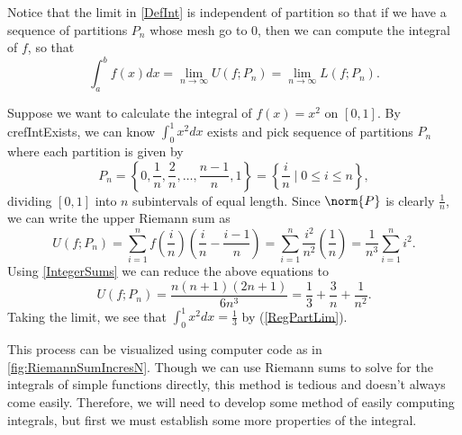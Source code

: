 Notice that the limit in \cref{DefInt} is independent of partition so that if we have a sequence of partitions $P_n$ whose mesh go to 0, then we can compute the integral of $f$, so that
\begin{equation}\label{RegPartLim}
  \int_{a}^{b}f(x)dx=\lim\limits_{n\to\infty}U(f;P_n)=\lim\limits_{n\to\infty}L(f;P_n).
\end{equation}
\begin{exmp}
Suppose we want to calculate the integral of $f(x)=x^2$ on $[0,1]$. By cref{IntExists}, we can know $\int_{0}^{1}x^2dx$ exists and  pick sequence of partitions $P_n$ where each partition is given by
\begin{equation}
  P_n=\left\{0, \frac{1}{n}, \frac{2}{n},\dotsc, \frac{n-1}{n}, 1 \right\}=\left\{\frac{i}{n}\mid 0\leq i\leq n\right\},
\end{equation}
dividing $[0,1]$ into $n$ subintervals of equal length.
Since $\norm{P}$ is clearly $\frac{1}{n}$, we can write the upper Riemann sum as
\begin{equation}
  U(f;P_n)=\sum_{i=1}^{n}f\left(\frac{i}{n}\right)\left(\frac{i}{n}-\frac{i-1}{n}\right)=\sum_{i=1}^{n}\frac{i^2}{n^2}\left(\frac{1}{n}\right)=\frac{1}{n^3}\sum_{i=1}^{n}i^2.
\end{equation}
Using \cref{IntegerSums} we can reduce the above equations to
\begin{equation}
  U(f;P_n)=\frac{n(n+1)(2n+1)}{6n^3}=\frac{1}{3}+\frac{3}{n}+\frac{1}{n^2}.
\end{equation}
Taking the limit, we see that $\int_{0}^{1}x^2dx=\frac{1}{3}$ by (\ref{RegPartLim}).
\end{exmp}

This process can be visualized using computer code as in \cref{fig:RiemannSumIncresN}. Though we can use Riemann sums to solve for the integrals of simple functions directly, this method is tedious and doesn't always come easily. Therefore, we will need to develop some method of easily computing integrals, but first we must establish some more properties of the integral.

